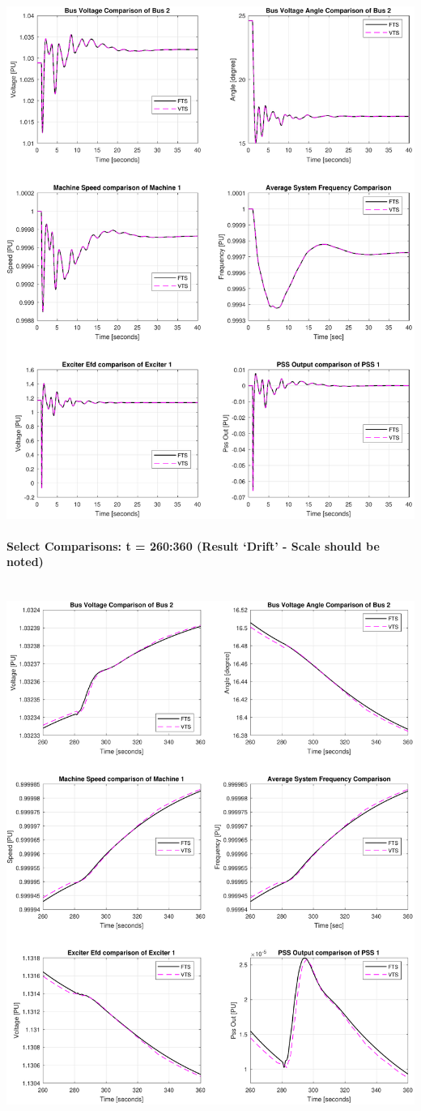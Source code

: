 \documentclass[12pt]{article}
\begin{document}
\includegraphics[width=\linewidth]{MWdetailComp1}


\pagebreak
\paragraph{Select Comparisons: t = 260:360 (Result `Drift' - Scale should be noted)} \ \\

\includegraphics[width=\linewidth]{MWdetailComp2}
\end{document}
